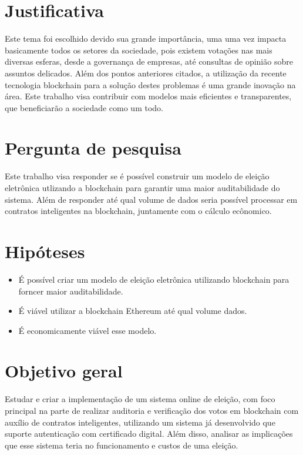 \documentclass{ufsctex/ufsctex}
\begin{document}
\section{Justificativa}

Este tema foi escolhido devido sua grande importância, uma uma vez impacta basicamente
todos os setores da sociedade, pois existem votações nas mais diversas esferas,
desde a governança de empresas, até consultas de opinião sobre assuntos delicados.
Além dos pontos anteriores citados, a utilização da recente tecnologia blockchain
para a solução destes problemas é uma grande inovação na área. Este trabalho visa
contribuir com modelos mais eficientes e transparentes, que beneficiarão a sociedade
como um todo.

\section{Pergunta de pesquisa}

Este trabalho visa responder se é possível construir um modelo de eleição
eletrônica utlizando a blockchain para garantir uma maior auditabilidade
do sistema. Além de responder até qual volume de dados seria possível processar
em contratos inteligentes na blockchain, juntamente com o cálculo ecônomico.

\section{Hipóteses}

\begin{itemize}
	\item É possível criar um modelo de eleição eletrônica utilizando blockchain
		para forncer maior auditabilidade.
	\item É viável utilizar a blockchain Ethereum até qual volume dados.
	\item É economicamente viável esse modelo.
\end{itemize}

\section{Objetivo geral}

Estudar e criar a implementação de um sistema online de eleição, com foco
principal na parte de realizar auditoria e verificação dos votos em blockchain
com auxílio de contratos inteligentes, utilizando um sistema já desenvolvido
que suporte autenticação com certificado digital. Além disso, analisar as implicações
que esse sistema teria no funcionamento e custos de uma eleição. \\
\end{document}
